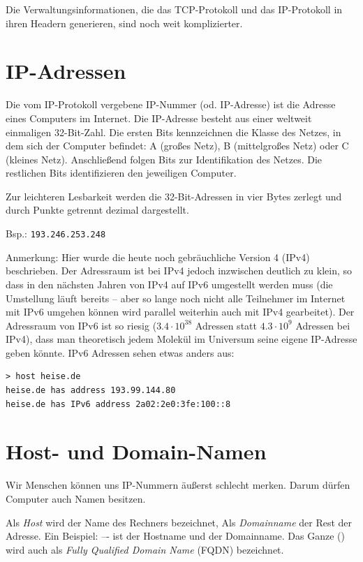 Die Verwaltungsinformationen, die das TCP-Protokoll und das IP-Protokoll in
ihren Headern generieren, sind noch weit komplizierter.


\section{IP-Adressen}

Die vom IP-Protokoll vergebene IP-Nummer (od. IP-Adresse) ist die Adresse eines
Computers im Internet. Die IP-Adresse besteht aus einer weltweit einmaligen
32-Bit-Zahl. Die ersten Bits kennzeichnen die Klasse des Netzes, in dem sich
der Computer befindet: A (großes Netz), B (mittelgroßes Netz) oder C (kleines
Netz). Anschließend folgen Bits zur Identifikation des Netzes. Die restlichen
Bits identifizieren den jeweiligen Computer.

Zur leichteren Lesbarkeit werden die 32-Bit-Adressen in vier Bytes zerlegt und
durch Punkte getrennt dezimal dargestellt.

Bsp.: \lstinline|193.246.253.248|

Anmerkung: Hier wurde die heute noch gebräuchliche Version 4 (IPv4)
beschrieben. Der Adressraum ist bei IPv4 jedoch inzwischen deutlich zu klein,
so dass in den nächsten Jahren von IPv4 auf IPv6 umgestellt werden muss (die
Umstellung läuft bereits -- aber so lange noch nicht alle Teilnehmer im Internet
mit IPv6 umgehen können wird parallel weiterhin auch mit IPv4 gearbeitet). Der
Adressraum von IPv6 ist so riesig ($3.4 \cdot 10^38$ Adressen statt $4.3 \cdot
10^9$ Adressen bei IPv4), dass man theoretisch jedem Molekül im Universum seine
eigene IP-Adresse geben könnte. IPv6 Adressen sehen etwas anders aus:

\begin{lstlisting}
> host heise.de
heise.de has address 193.99.144.80
heise.de has IPv6 address 2a02:2e0:3fe:100::8
\end{lstlisting}
 
\section{Host- und Domain-Namen}

Wir Menschen können uns IP-Nummern äußerst schlecht merken. Darum dürfen
Computer auch Namen besitzen. 

Als \emph{Host} wird der Name des Rechners bezeichnet, Als \emph{Domainname} der
Rest der Adresse. Ein Beispiel:  –- 
ist der Hostname und  der Domainname.
Das Ganze () wird auch als \emph{Fully Qualified Domain
Name} (FQDN) bezeichnet.


